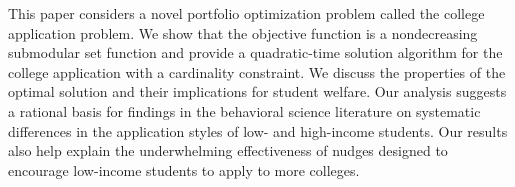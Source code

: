 This paper considers a novel portfolio optimization problem called the college application problem. We show that the objective function is a nondecreasing submodular set function and provide a quadratic-time solution algorithm for the college application with a cardinality constraint. We discuss the properties of the optimal solution and their implications for student welfare. Our analysis suggests a rational basis for findings in the behavioral science literature on systematic differences in the application styles of low- and high-income students. Our results also help explain the underwhelming effectiveness of nudges designed to encourage low-income students to apply to more colleges. 
